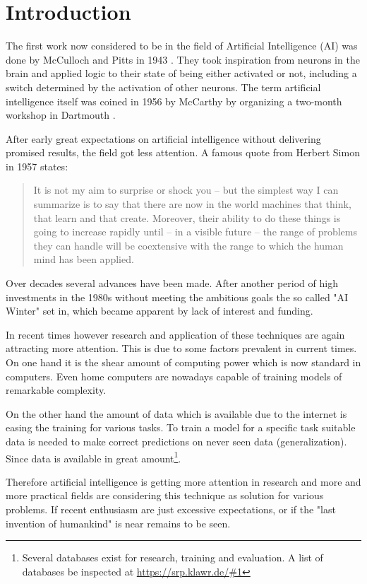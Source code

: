 \section{Introduction}

The first work now considered to be in the field of Artificial Intelligence (AI) was done by McCulloch and Pitts in 1943 \cite{McCulloch1943}.
They took inspiration from neurons in the brain and applied logic to their state of being either activated or not, including a switch determined by the activation of other neurons.
The term artificial intelligence itself was coined in 1956 by McCarthy by organizing a two-month workshop in Dartmouth \cite{McCarthy1955}.

After early great expectations on artificial intelligence without delivering promised results, the field got less attention.
A famous quote from Herbert Simon in 1957 states: 
\begin{quotation}
    It is not my aim to surprise or shock you – but the simplest way I can summarize is to say that there are now in the world machines that think, that learn and that create. Moreover, their ability to do these things is going to increase rapidly until – in a visible future – the range of problems they can handle will be coextensive with the range to which the human mind has been applied.
\end{quotation}

Over decades several advances have been made.
After another period of high investments in the 1980s without meeting the ambitious goals the so called "AI Winter" set in, which became apparent by lack of interest and funding.

In recent times however research and application of these techniques are again attracting more attention.
This is due to some factors prevalent in current times.
On one hand it is the shear amount of computing power which is now standard in computers.
Even home computers are nowadays capable of training models of remarkable complexity.

On the other hand the amount of data which is available due to the internet is easing the training for various tasks.
To train a model for a specific task suitable data is needed to make correct predictions on never seen data (generalization).
Since data is available in great amount\footnote{Several databases exist for research, training and evaluation.
A list of databases be inspected at \url{https://srp.klawr.de/\#1}}.

Therefore artificial intelligence is getting more attention in research and more and more practical fields are considering this technique as solution for various problems.
If recent enthusiasm are just excessive expectations, or if the "last invention of humankind" \cite{Good1965} is near remains to be seen.

